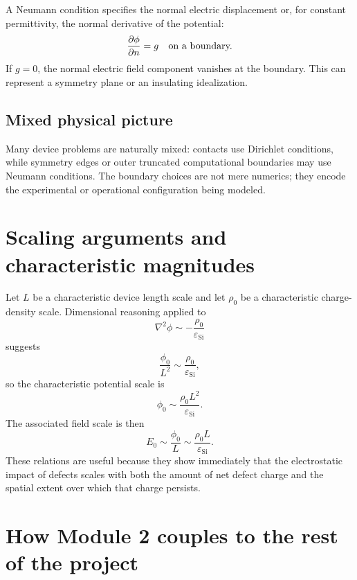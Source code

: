 \documentclass[11pt]{article}
\begin{document}
A Neumann condition specifies the normal electric displacement or, for constant permittivity, the normal derivative of the potential:
\begin{equation}
\pdv{\phi}{n} = g \quad \text{on a boundary.}
\end{equation}
If $g=0$, the normal electric field component vanishes at the boundary. This can represent a symmetry plane or an insulating idealization.

\subsection{Mixed physical picture}

Many device problems are naturally mixed: contacts use Dirichlet conditions, while symmetry edges or outer truncated computational boundaries may use Neumann conditions. The boundary choices are not mere numerics; they encode the experimental or operational configuration being modeled.

\section{Scaling arguments and characteristic magnitudes}

Let $L$ be a characteristic device length scale and let $\rho_0$ be a characteristic charge-density scale. Dimensional reasoning applied to
\begin{equation}
\nabla^2 \phi \sim -\frac{\rho_0}{\varepsilon_{\mathrm{Si}}}
\end{equation}
suggests
\begin{equation}
\frac{\phi_0}{L^2} \sim \frac{\rho_0}{\varepsilon_{\mathrm{Si}}},
\end{equation}
so the characteristic potential scale is
\begin{equation}
\phi_0 \sim \frac{\rho_0 L^2}{\varepsilon_{\mathrm{Si}}}.
\end{equation}
The associated field scale is then
\begin{equation}
E_0 \sim \frac{\phi_0}{L} \sim \frac{\rho_0 L}{\varepsilon_{\mathrm{Si}}}.
\end{equation}
These relations are useful because they show immediately that the electrostatic impact of defects scales with both the amount of net defect charge and the spatial extent over which that charge persists.

\section{How Module 2 couples to the rest of the project}
\end{document}
